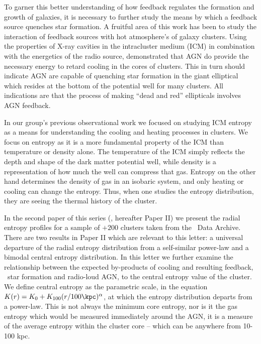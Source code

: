 \documentclass{emulateapj}
\begin{document}
To garner this better understanding of how feedback regulates the
formation and growth of galaxies, it is necessary to further study the
means by which a feedback source quenches star formation. A fruitful
area of this work has been to study the interaction of feedback
sources with hot atmosphere's of galaxy clusters. Using the properties
of X-ray cavities in the intracluster medium (ICM) in combination with
the energetics of the radio source, \cite{2004ApJ...607..800B}
demonstrated that AGN do provide the necessary energy to retard
cooling in the cores of clusters. This in turn should indicate AGN are
capable of quenching star formation in the giant elliptical which
resides at the bottom of the potential well for many clusters. All
indications are that the process of making ``dead and red''
ellipticals involves AGN feedback.

In our group's previous observational work \citep{2005ApJ...630L..13D,
2006ApJ...643..730D, accept2} we focused on studying ICM entropy
as a means for understanding the cooling and heating processes in
clusters. We focus on entropy as it is a more fundamental property of
the ICM than temperature or density alone. The temperature of the ICM
simply reflects the depth and shape of the dark matter potential well,
while density is a representation of how much the well can
compress that gas. Entropy on the other hand determines the density of
gas in an isobaric system, and only heating or cooling can change the
entropy. Thus, when one studies the entropy distribution, they are
seeing the thermal history of the cluster.

In the second paper of this series (\cite{accept2}, hereafter Paper II)
we present the radial entropy profiles for a sample of $+200$ clusters
taken from the \Chandra\ Data Archive. There are two results in Paper
II which are relevant to this letter: a universal departure of the
radial entropy distribution from a self-similar power-law and a bimodal
central entropy distribution. In this letter we further
examine the relationship between the expected by-products of cooling
and resulting feedback, \eg\ star formation and radio-loud AGN, to the
central entropy value of the cluster. We define central entropy as the
parametric scale, \kna in the equation $K(r) = K_0 +K_{100}(r/100
\kpc)^{\alpha}$, at which the entropy distribution departs from
a power-law. This is not always the minimum core entropy, nor is it
the gas entropy which would be measured immediately around the AGN, it
is a measure of the average entropy within the cluster core -- which
can be anywhere from 10-100 kpc.
\end{document}

